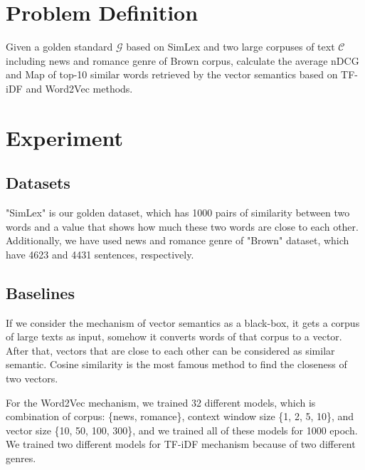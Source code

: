 \documentclass[sigconf]{acmart}
\begin{document}
\section{Problem Definition}
Given a golden standard $\mathcal{G}$ based on SimLex and two large corpuses of text $\mathcal{C}$ including news and romance genre of Brown corpus, calculate the average nDCG and Map of top-10 similar words retrieved by the vector semantics based on
TF-iDF and Word2Vec methods.
\section{Experiment}
\subsection{Datasets}
"SimLex" is our golden dataset, which has 1000 pairs of similarity between two words and a value that shows how much these two words are close to each other. Additionally, we have used news and romance genre of "Brown" dataset, which have 4623 and 4431 sentences, respectively. 
\subsection{Baselines}
If we consider the mechanism of vector semantics as a black-box, it gets a corpus of large texts as input, somehow it converts words of that corpus to a vector. After that, vectors that are close to each other can be considered as similar semantic. Cosine similarity is the most famous method to find the closeness of two vectors. 

For the Word2Vec mechanism, we trained 32 different models, which is combination of corpus: \{news, romance\}, context window size \{1, 2, 5, 10\}, and vector size \{10, 50, 100, 300\}, and we trained all of these models for 1000 epoch. We trained two different models for TF-iDF mechanism because of two different genres. 
\end{document}
